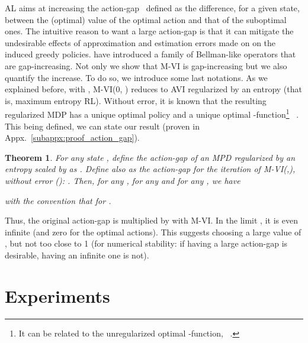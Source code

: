 \documentclass{article}
\newtheorem{theorem}{Theorem}
\begin{document}
AL aims at increasing the action-gap~\cite{farahmand2011action} defined as the difference, for a given state, between the (optimal) value of the optimal action and that of the suboptimal ones. The intuitive reason to want a large action-gap is that it can mitigate the undesirable effects of approximation and estimation errors made on  on the induced greedy policies. \citet{bellemare2016increasing} have introduced a family of Bellman-like operators that are gap-increasing. Not only we show that M-VI is gap-increasing but we also quantify the increase. To do so, we introduce some last notations. As we explained before, with , M-VI(0, ) reduces to AVI regularized by an entropy (that is, maximum entropy RL). Without error, it is known that the resulting regularized MDP has a unique optimal policy  and a unique optimal -function\footnote{It can be related to the unregularized optimal -function, ~\cite{geist2019theory}.} ~\cite{geist2019theory}. This being defined, we can state our result (proven in Appx.~\ref{subappx:proof_action_gap}).
\begin{theorem}
\label{thm:action_gap}
    For any state , define the action-gap of an MPD regularized by an entropy scaled by  as . Define also  as the action-gap for the  iteration of M-VI(,), without error (): . Then, for any , for any  and for any , we have
    
with the convention that  for .
\end{theorem}
Thus, the original action-gap is multiplied by  with M-VI. In the limit , it is even infinite (and zero for the optimal actions). This suggests choosing a large value of , but not too close to 1 (for numerical stability: if having a large action-gap is desirable, having an infinite one is not).






\section{Experiments \label{sec:experiments}}
\end{document}
